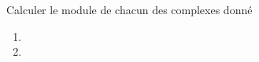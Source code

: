 \begin{exercice}

 Calculer le module de chacun des complexes donn\'e
  \begin{enumerate}
  \item {}
  \item {}
  \end{enumerate}
\end{exercice}
